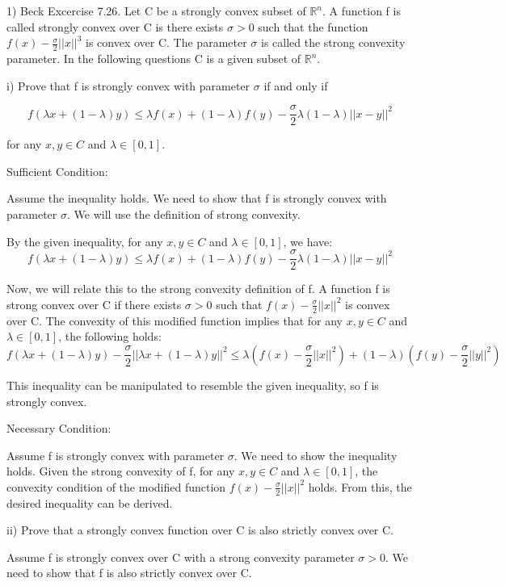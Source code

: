 \documentclass{article}
\newcommand{\RR}{\mathbb{R}}
\begin{document}
1) Beck Excercise 7.26. Let C be a strongly convex subset of $\RR^n$.
A function f is called strongly convex over C is there exists $\sigma > 0$
such that the function $f(x) - \frac{\sigma}{2} ||x||^3$ is convex over C.
The parameter $\sigma$ is called the strong convexity parameter.
In the following questions C is a given subset of $\RR^n$.

i) Prove that f is strongly convex with parameter $\sigma$ if and only if

\[f(\lambda x + (1-\lambda)y) \leq \lambda f(x) + (1-\lambda)f(y) - \frac{\sigma}{2} \lambda(1-\lambda) ||x-y||^2\]

for any $x, y \in C$ and $\lambda \in [0, 1]$.


Sufficient Condition:

Assume the inequality holds. We need to show that f is strongly convex
with parameter $\sigma$. We will use the definition of strong convexity.

By the given inequality, for any $x, y \in C$ and $\lambda \in [0, 1]$,
we have:
\[f(\lambda x + (1-\lambda)y) \leq \lambda f(x) + (1-\lambda)f(y) - \frac{\sigma}{2} \lambda (1-\lambda) ||x-y||^2\]

Now, we will relate this to the strong convexity definition of f. A function
f is strong convex over C if there exists $\sigma > 0$ such that
$f(x) - \frac{\sigma}{2} ||x||^2$ is convex over C. The convexity of this
modified function implies that for any $x, y \in C$ and $\lambda \in [0, 1]$,
the following holds:
\[f(\lambda x + (1-\lambda)y) - \frac{\sigma}{2} ||\lambda x + (1-\lambda)y||^2 \leq \lambda(f(x) - \frac{\sigma}{2}||x||^2) + (1-\lambda)(f(y) - \frac{\sigma}{2}||y||^2)\]

This inequality can be manipulated to resemble the given inequality,
so f is strongly convex.


Necessary Condition:

Assume f is strongly convex with parameter $\sigma$. We need to show
the inequality holds. Given the strong convexity of f, for any $x, y \in C$
and $\lambda \in [0, 1]$, the convexity condition of the modified function
$f(x) - \frac{\sigma}{2} ||x||^2$ holds. From this, the desired inequality
can be derived.


ii) Prove that a strongly convex function over C is also strictly convex over C.

Assume f is strongly convex over C with a strong convexity parameter
$\sigma > 0$. We need to show that f is also strictly convex over C.
\end{document}
